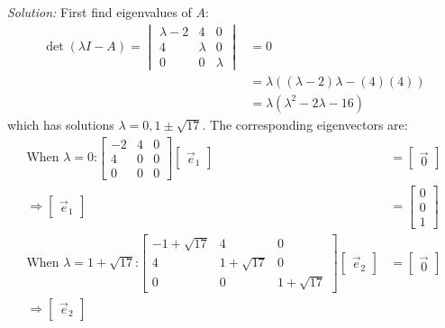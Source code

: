 \documentclass[11pt]{homework}
\begin{document}
\emph{Solution:}
\newline
First find eigenvalues of $A$:
\begin{align*}
\det (\lambda I - A) = 
  \begin{vmatrix}
    \lambda -2 & 4 & 0 \\
    4 & \lambda & 0 \\
    0 & 0 & \lambda 
  \end{vmatrix}
  &= 0 \\
  &= \lambda ( (\lambda - 2)\lambda - (4)(4)) \\
  &= \lambda ( \lambda^2 - 2 \lambda - 16) 
\end{align*}
which has solutions $\lambda = 0, 1\pm \sqrt{17}$.
The corresponding eigenvectors are:
\begin{align*}
  \text{When $\lambda = 0$:}
    \begin{bmatrix}
      -2 & 4 & 0 \\
      4 & 0  & 0 \\
      0 & 0 & 0  
    \end{bmatrix}
    \begin{bmatrix}
      \vec e_1
    \end{bmatrix}
    &=
    \begin{bmatrix}
      \vec 0
    \end{bmatrix} \\
    \Rightarrow
    \begin{bmatrix}
      \vec e_1
    \end{bmatrix}
    &=
    \begin{bmatrix}
    0 \\
    0 \\
    1
    \end{bmatrix} \\
  \text{When $\lambda = 1+\sqrt{17}$:}
    \begin{bmatrix}
      -1 + \sqrt{17} & 4 & 0 \\
      4 & 1+\sqrt{17}  & 0 \\
      0 & 0 & 1+\sqrt{17}
    \end{bmatrix}
    \begin{bmatrix}
      \vec e_2
    \end{bmatrix}
    &=
    \begin{bmatrix}
      \vec 0
    \end{bmatrix} \\
    \Rightarrow
    \begin{bmatrix}
      \vec e_2
    \end{bmatrix}

\end{align*}
\end{document}
